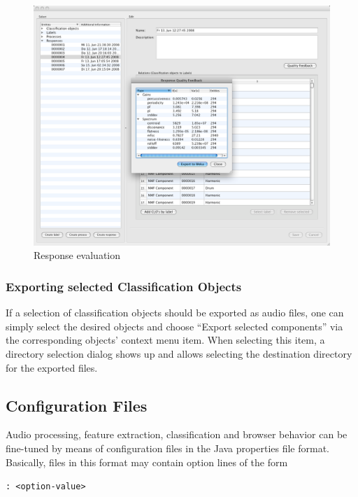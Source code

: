 \begin{figure}
    \includegraphics[width=\textwidth]{images/QualityFeedback.png}
    \caption{%
        \label{figure:QualityFeedback}
        Response evaluation
    }
\end{figure}


\subsubsection{Exporting selected Classification Objects}

If a selection of classification objects should be exported as audio files, one
can simply select the desired objects and choose ``Export selected components''
via the corresponding objects' context menu item. When selecting this item, a
directory selection dialog shows up and allows selecting the destination
directory for the exported files.


\subsection{Configuration Files}

\label{section:ConfigFiles}

Audio processing, feature extraction, classification and browser behavior can be
fine-tuned by means of configuration files in the Java properties file
format. Basically, files in this format may contain option lines of the form

\centerline{\tt <option-name>: <option-value>}

